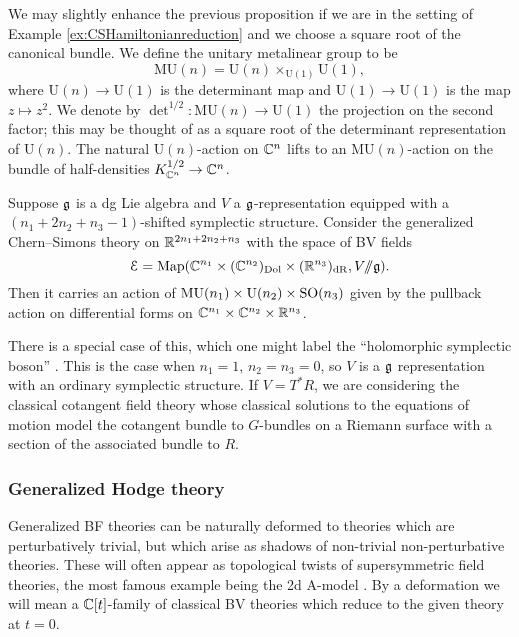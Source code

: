 \documentclass[10pt, oneside]{article}
\newcommand{\MU}{\mathrm{MU}}
\renewcommand{\U}{\mathrm{U}}
\newcommand{\ham}{/\!\!/}
\begin{document}
We may slightly enhance the previous proposition if we are in the setting of Example \ref{ex:CSHamiltonianreduction} and we choose a square root of the canonical bundle. We define the unitary metalinear group to be
\[\MU(n) = \U(n)\times_{\U(1)} \U(1),\]
where $\U(n)\rightarrow \U(1)$ is the determinant map and $\U(1)\rightarrow \U(1)$ is the map $z\mapsto z^2$. We denote by $\det^{1/2}\colon \MU(n)\rightarrow \U(1)$ the projection on the second factor; this may be thought of as a square root of the determinant representation of $\U(n)$. The natural $\U(n)$-action on $\mathbb C^n$ lifts to an $\MU(n)$-action on the bundle of half-densities $K_{\mathbb C^n}^{1/2}\rightarrow \mathbb C^n$.

\begin{prop}
Suppose $\mathfrak g$ is a dg Lie algebra and $V$ a $\mathfrak g$-representation equipped with a $(n_1+2n_2+n_3-1)$-shifted symplectic structure. Consider the generalized Chern--Simons theory on $\mathbb R^{2n_1+2n_2+n_3}$ with the space of BV fields
\[\cE = \map(\CC^{n_1}\times (\CC^{n_2})_{\mr{Dol}}\times (\RR^{n_3})_{\mr{dR}}, V\ham\fg).\]
Then it carries an action of $\MU(n_1)\times \U(n_2)\times \SO(n_3)$ given by the pullback action on differential forms on $\mathbb C^{n_1}\times \mathbb C^{n_2}\times \mathbb R^{n_3}$.
\end{prop}

\begin{example}
There is a special case of this, which one might label the ``holomorphic symplectic boson'' \cite[Definition 4.8]{SWchar}.  This is the case when $n_1 = 1$, $n_2 = n_3 = 0$, so $V$ is a $\mathfrak g$ representation with an ordinary symplectic structure.  If $V = T^*R$, we are considering the classical cotangent field theory whose classical solutions to the equations of motion model the cotangent bundle to $G$-bundles on a Riemann surface with a section of the associated bundle to $R$.
\end{example}

\subsubsection{Generalized Hodge theory}
Generalized BF theories can be naturally deformed to theories which are perturbatively trivial, but which arise as shadows of non-trivial non-perturbative theories.  These will often appear as topological twists of supersymmetric field theories, the most famous example being the 2d A-model . By a deformation we will mean a $\mathbb C[t]$-family of classical BV theories which reduce to the given theory at $t=0$.
\end{document}
